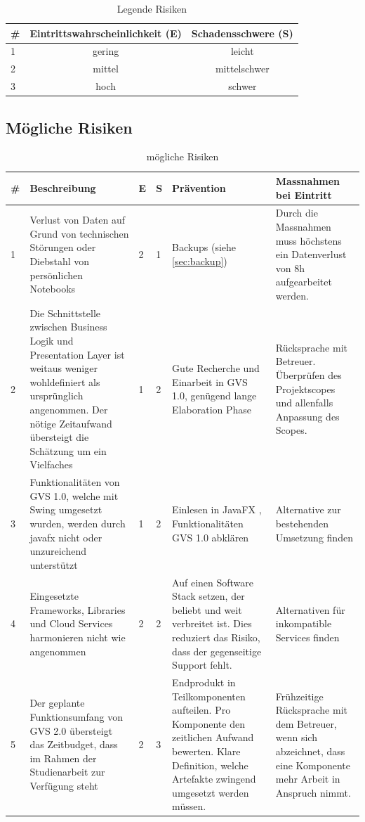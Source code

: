 \documentclass[11pt,a4paper,english,oneside]{book}
\numberwithin{equation}{chapter}
\begin{document}
	\begin{table}[h!]
		\centering
		\begin{tabular}{l c c}
			\toprule 
			\# & Eintrittswahrscheinlichkeit (E) & Schadensschwere (S) \\
			\toprule 
			1 & gering & leicht  \\
			2 & mittel & mittelschwer \\
			3 & hoch & schwer \\
			\bottomrule 
		\end{tabular} 
		\caption{Legende Risiken} 
	\end{table}
	\begin{landscape}		
		\subsection{Mögliche Risiken}
		\begin{table}[h!]
			\centering
			\begin{tabularx}{\linewidth}{l X l l X X}
				\toprule 
				\# & Beschreibung & E & S & Prävention & Massnahmen bei Eintritt \\
				\toprule 
				1 & Verlust von Daten auf Grund von technischen Störungen oder Diebstahl von persönlichen Notebooks & 2 & 1 & Backups (siehe \ref{sec:backup}) & Durch die Massnahmen muss höchstens ein Datenverlust von 8h aufgearbeitet werden. \\
				\midrule
				2 & Die Schnittstelle zwischen Business Logik und Presentation Layer ist weitaus weniger wohldefiniert als ursprünglich angenommen. Der nötige Zeitaufwand übersteigt die Schätzung um ein Vielfaches & 1 & 2 & Gute Recherche und Einarbeit in GVS 1.0, genügend lange Elaboration Phase & Rücksprache mit Betreuer. Überprüfen des Projektscopes und allenfalls Anpassung des Scopes. \\
				\midrule
				3 & Funktionalitäten von GVS 1.0, welche mit Swing umgesetzt wurden, werden durch \gls{javafx} nicht oder unzureichend unterstützt & 1 & 2 & Einlesen in JavaFX \cite{javafxbook}, Funktionalitäten GVS 1.0 abklären & Alternative zur bestehenden Umsetzung finden \\
				\midrule
				4 & Eingesetzte Frameworks, Libraries und Cloud Services harmonieren nicht wie angenommen & 2 & 2 & Auf einen Software Stack setzen, der beliebt und weit verbreitet ist. Dies reduziert das Risiko, dass der gegenseitige Support fehlt. & Alternativen für inkompatible Services finden \\  
				\midrule 
				5 & Der geplante Funktionsumfang von GVS 2.0 übersteigt das Zeitbudget, dass im Rahmen der Studienarbeit zur Verfügung steht & 2 & 3 & Endprodukt in Teilkomponenten aufteilen. Pro Komponente den zeitlichen Aufwand bewerten. Klare Definition, welche Artefakte zwingend umgesetzt werden müssen. & Frühzeitige Rücksprache mit dem Betreuer, wenn sich abzeichnet, dass eine Komponente mehr Arbeit in Anspruch nimmt. \\  
				\bottomrule 
			\end{tabularx} 
			\caption{mögliche Risiken} 
		\end{table}
	\end{landscape}
	
\end{document}
